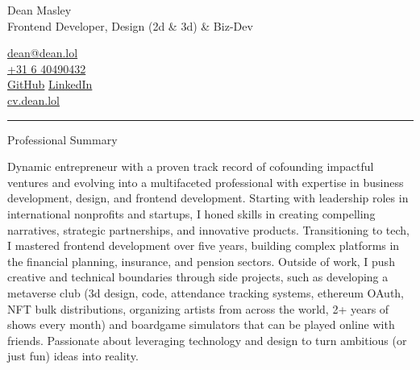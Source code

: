 \documentclass[a4paper]{article}
\newlength{\baseunit}
\newcommand{\spacingxxs}{\vspace{0.25\baseunit}}  %
\newcommand{\spacingxs}{\vspace{0.5\baseunit}}    %
\newcommand{\spacingsm}{\vspace{\baseunit}}       %
\newcommand{\displayOne}[1]{{\Large\fontsize{16}{16}\selectfont #1}}    %
\newcommand{\headingTwo}[1]{{\normalsize\fontsize{12}{12}\selectfont #1}}    %
\newcommand{\bodyLarge}[1]{{\fontsize{9}{9}\selectfont #1}}                   %
\newcommand{\bodyDefault}[1]{{\fontsize{8}{8}\selectfont #1}}                 %
\newcommand{\bodySmall}[1]{{\fontsize{8}{8}\selectfont #1}}                   %
\newcommand{\summary}[1]{%
    {\bodyDefault{\setlength{\parskip}{0.5\baseunit}%
    \setlength{\baselineskip}{1.4\baseunit}%
    #1}}%
    \spacingxs
}
\newcommand{\resumeHeader}[3]{%
    \begin{minipage}[c]{0.5\textwidth}
        {\displayOne{\textcolor{textPrimary}{#1}}}\\
        {\bodyLarge{\textcolor{textSecondary}{#2}}}%
    \end{minipage}%
    \hfill
    \begin{minipage}[c]{0.5\textwidth}
        \raggedleft
        {\bodySmall{#3}}%
    \end{minipage}
}
\newcommand{\customDivider}{%
    \spacingsm
    {\color{divider}\hrule height 0.5pt}%
    \spacingsm
}
\newcommand{\sectionHeading}[1]{%
    \customDivider
    {\headingTwo{\textcolor{textPrimary}{#1}}}%
    \spacingxxs
}
\begin{document}
\resumeHeader{Dean Masley}{Frontend Developer, Design (2d \& 3d) \& Biz-Dev}{
    \href{mailto:dean@dean.lol}{\textcolor{textTertiary}{dean@dean.lol}} \\[0.15\baseunit]
    \href{tel:+31640490432}{\textcolor{textTertiary}{+31 6 40490432}} \\[0.15\baseunit]
    \href{https://github.com/jollygrin}{\textcolor{linkColor}{GitHub}} \textbullet{}
    \href{https://linkedin.com/in/dmasley}{\textcolor{linkColor}{LinkedIn}} \\[0.15\baseunit]
    \href{https://cv.dean.lol}{\textcolor{linkColor}{cv.dean.lol}} \\[0.15\baseunit]
}

\sectionHeading{Professional Summary}

\summary{Dynamic entrepreneur with a proven track record of cofounding impactful ventures and evolving into a multifaceted professional with expertise in business development, design, and frontend development. Starting with leadership roles in international nonprofits and startups, I honed skills in creating compelling narratives, strategic partnerships, and innovative products. Transitioning to tech, I mastered frontend development over five years, building complex platforms in the financial planning, insurance, and pension sectors. Outside of work, I push creative and technical boundaries through side projects, such as developing a metaverse club (3d design, code, attendance tracking systems, ethereum OAuth, NFT bulk distributions, organizing artists from across the world, 2+ years of shows every month) and boardgame simulators that can be played online with friends. Passionate about leveraging technology and design to turn ambitious (or just fun) ideas into reality.}

\spacingsm
\end{document}
